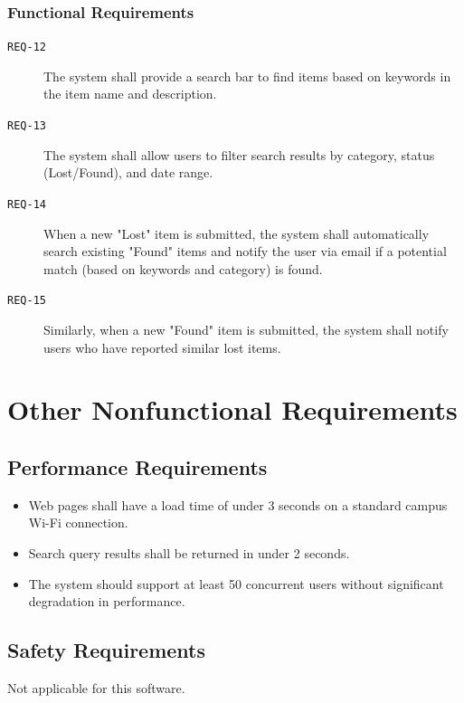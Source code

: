\documentclass[11pt, a4paper]{article}
\begin{document}
\subsubsection{Functional Requirements}
\begin{description}
    \item[\texttt{REQ-12}] The system shall provide a search bar to find items based on keywords in the item name and description.
    \item[\texttt{REQ-13}] The system shall allow users to filter search results by category, status (Lost/Found), and date range.
    \item[\texttt{REQ-14}] When a new "Lost" item is submitted, the system shall automatically search existing "Found" items and notify the user via email if a potential match (based on keywords and category) is found.
    \item[\texttt{REQ-15}] Similarly, when a new "Found" item is submitted, the system shall notify users who have reported similar lost items.
\end{description}

\section{Other Nonfunctional Requirements}

\subsection{Performance Requirements}
\begin{itemize}
    \item Web pages shall have a load time of under 3 seconds on a standard campus Wi-Fi connection.
    \item Search query results shall be returned in under 2 seconds.
    \item The system should support at least 50 concurrent users without significant degradation in performance.
\end{itemize}

\subsection{Safety Requirements}
Not applicable for this software.
\end{document}
